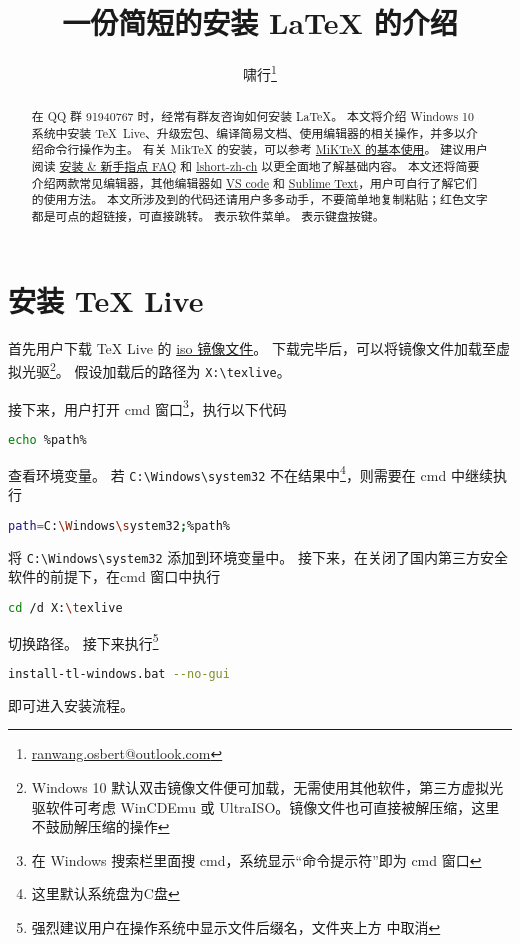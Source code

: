 \documentclass{ctexart}
\title{\bfseries 一份简短的安装 \LaTeX{} 的介绍}
\author{啸行\thanks{\url{ranwang.osbert@outlook.com}}}
\begin{document}
  
\maketitle

\begin{abstract}
在 QQ 群 91940767 时，经常有群友咨询如何安装 \LaTeX{}。
本文将介绍 Windows 10 系统中安装 \TeX{}~Live、升级宏包、编译简易文档、使用编辑器的相关操作，并多以介绍命令行操作为主。
有关 Mik\TeX{} 的安装，可以参考 \href{https://camuseblog.top/2019-03-02-/MiKTeX/}{MiK\TeX{} 的基本使用}。
建议用户阅读 \href{http://www.latexstudio.net/archives/11469.html}{\LaTeXe{} 安装 \& 新手指点 FAQ} 和 \href{http://mirrors.ctan.org/info/lshort/chinese/lshort-zh-cn.pdf}{lshort-zh-ch} 以更全面地了解基础内容。
本文还将简要介绍两款常见编辑器，其他编辑器如 \href{https://github.com/EthanDeng/vscode-latex}{VS code} 和 \href{https://github.com/EthanDeng/sublime-text-latex}{Sublime Text}，用户可自行了解它们的使用方法。
本文所涉及到的代码还请用户多多动手，不要简单地复制粘贴；红色文字都是可点的超链接，可直接跳转。
 表示软件菜单。
 表示键盘按键。

\end{abstract}

\section{安装 \TeX{} Live}
首先用户下载 \TeX{} Live 的 \href{http://mirrors.ctan.org/systems/texlive/Images/texlive.iso}{iso 镜像文件}。
下载完毕后，可以将镜像文件加载至虚拟光驱\footnote{Windows 10 默认双击镜像文件便可加载，无需使用其他软件，第三方虚拟光驱软件可考虑 WinCDEmu 或 UltraISO。镜像文件也可直接被解压缩，这里不鼓励解压缩的操作}。
假设加载后的路径为 \texttt{X:\textbackslash texlive}。

接下来，用户打开 \textsf{cmd} 窗口\footnote{在 Windows 搜索栏里面搜 cmd，系统显示“命令提示符”即为 \textsf{cmd} 窗口}，执行以下代码
\begin{lstlisting}[language = bash]
  echo %path%
\end{lstlisting}
查看环境变量。
若 \texttt{C:\textbackslash Windows\textbackslash system32} 不在结果中\footnote{这里默认系统盘为\textsf{C}盘}，则需要在 \textsf{cmd} 中继续执行
\begin{lstlisting}[language = bash]
  path=C:\Windows\system32;%path%
\end{lstlisting}
将 \texttt{C:\textbackslash Windows\textbackslash system32} 添加到环境变量中。
接下来，在关闭了国内第三方安全软件的前提下，在\textsf{cmd} 窗口中执行
\begin{lstlisting}[language = bash]
  cd /d X:\texlive
\end{lstlisting}
切换路径。
接下来执行\footnote{强烈建议用户在操作系统中显示文件后缀名，文件夹上方  中取消 }
\begin{lstlisting}[language = bash]
  install-tl-windows.bat --no-gui
\end{lstlisting}
即可进入安装流程。
\end{document}
